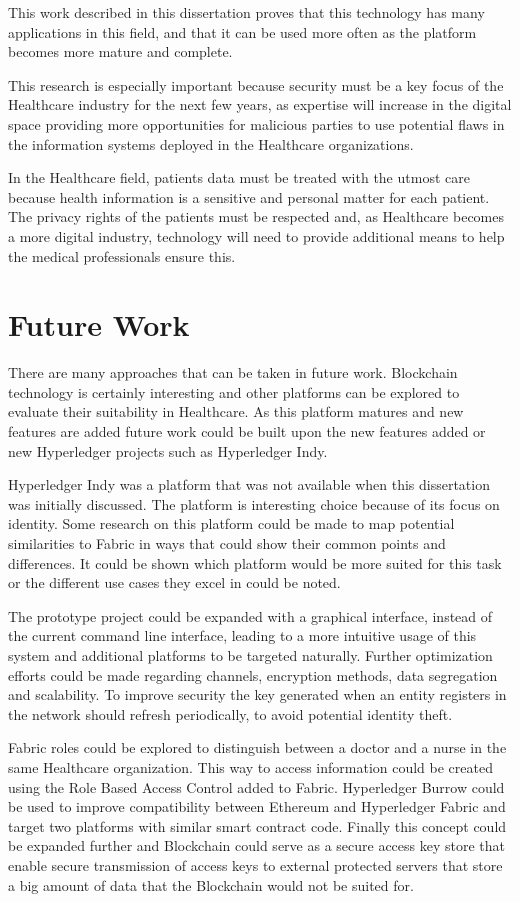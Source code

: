 This work described in this dissertation proves that this technology has many
applications in this field, and that it can be used more often as the platform
becomes more mature and complete.

This research is especially important because security must be a key focus of
the Healthcare industry for the next few years, as expertise will increase in
the digital space providing more opportunities for malicious parties to use
potential flaws in the information systems deployed in the Healthcare
organizations.

In the Healthcare field, patients data must be treated with the utmost care
because health information is a sensitive and personal matter for each patient.
The privacy rights of the patients must be respected and, as Healthcare becomes
a more digital industry, technology will need to provide additional means to
help the medical professionals ensure this.

\section{Future Work} \label{futureWork}

There are many approaches that can be taken in future work. Blockchain
technology is certainly interesting and other platforms can be explored to
evaluate their suitability in Healthcare. As this platform matures and new
features are added future work could be built upon the new features added or
new Hyperledger projects such as Hyperledger Indy. 

Hyperledger Indy was a platform that was not available when this dissertation
was initially discussed. The platform is interesting choice because of its
focus on identity. Some research on this platform could be made to map
potential similarities to Fabric in ways that could show their common points
and differences. It could be shown which platform would be more suited for this
task or the different use cases they excel in could be noted.

The prototype project could be expanded with a graphical interface, instead of
the current command line interface, leading to a more intuitive usage of this
system and additional platforms to be targeted naturally. Further optimization
efforts could be made regarding channels, encryption methods, data segregation
and scalability. To improve security the key generated when an entity registers
in the network should refresh periodically, to avoid potential identity theft.

Fabric roles could be explored to distinguish between a doctor and a nurse in
the same Healthcare organization.  This way to access information could be
created using the Role Based Access Control added to Fabric.  Hyperledger
Burrow could be used to improve compatibility between Ethereum and Hyperledger
Fabric and target two platforms with similar smart contract code.  Finally this
concept could be expanded further and Blockchain could serve as a secure access
key store that enable secure transmission of access keys to external protected
servers that store a big amount of data that the Blockchain would not be suited
for.
